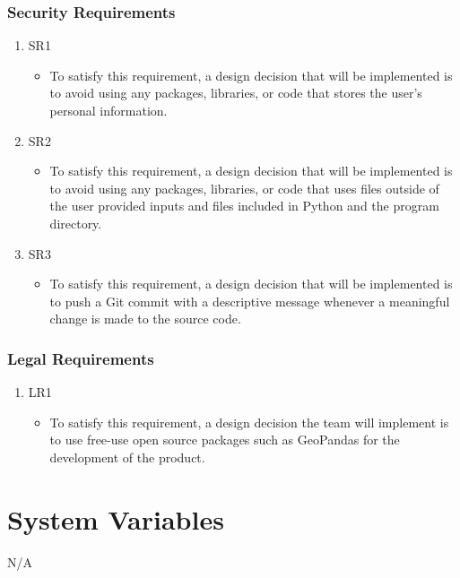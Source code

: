 \documentclass[12pt, titlepage]{article}
\begin{document}
\subsubsection{Security Requirements}

\begin{enumerate}
    \item SR1
    \begin{itemize}
        \item To satisfy this requirement, a design decision that will be implemented is to avoid using any packages, libraries, or code that stores the user's personal information.
    \end{itemize}
    \item SR2
    \begin{itemize}
        \item To satisfy this requirement, a design decision that will be implemented is to avoid using any packages, libraries, or code that uses files outside of the user provided inputs and files included in Python and the program directory.
    \end{itemize}
    \item SR3
    \begin{itemize}
        \item To satisfy this requirement, a design decision that will be implemented is to push a Git commit with a descriptive message whenever a meaningful change is made to the source code.
    \end{itemize}
\end{enumerate}

\subsubsection{Legal Requirements}

\begin{enumerate}
    \item LR1
    \begin{itemize}
        \item To satisfy this requirement, a design decision the team will implement is to use free-use open source packages such as GeoPandas for the development of the product.
    \end{itemize}
\end{enumerate}

\section{System Variables}
N/A
\end{document}

